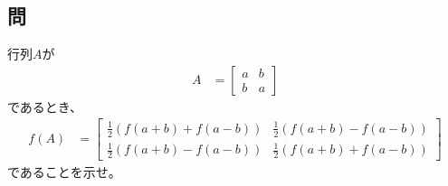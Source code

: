 \subsection{問}
行列$A$が
\begin{align}
	A
&=
	\left[
	\begin{array}{cc}
		a & b \\
		b & a
	\end{array}
	\right]
\end{align}
であるとき、
\begin{align}
	f(A)
&=
	\left[
	\begin{array}{cc}
		\frac{1}{2}(f(a+b)+f(a-b)) &
		\frac{1}{2}(f(a+b)-f(a-b)) \\
		\frac{1}{2}(f(a+b)-f(a-b)) &
		\frac{1}{2}(f(a+b)+f(a-b))
	\end{array}
	\right]
\end{align}
であることを示せ。

